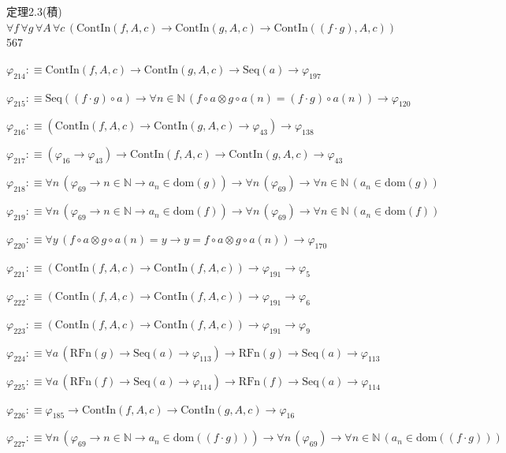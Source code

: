 \begin{fullproof}{定理2.3(積)}{$\forall f\,\forall g\,\forall A\,\forall c\,(\mathrm{ContIn}(f,A,c) \to \mathrm{ContIn}(g,A,c) \to \mathrm{ContIn}((f \cdot g),A,c))$}{567}
\begin{abbrevlist}
\item $\varphi_{214} :\equiv \mathrm{ContIn}(f,A,c) \to \mathrm{ContIn}(g,A,c) \to \mathrm{Seq}(a) \to \varphi_{197}$
\item $\varphi_{215} :\equiv \mathrm{Seq}((f \cdot g) \circ a) \to \forall n \in \mathbb{N}\,(f \circ a \otimes g \circ a(n) = (f \cdot g) \circ a(n)) \to \varphi_{120}$
\item $\varphi_{216} :\equiv (\mathrm{ContIn}(f,A,c) \to \mathrm{ContIn}(g,A,c) \to \varphi_{43}) \to \varphi_{138}$
\item $\varphi_{217} :\equiv (\varphi_{16} \to \varphi_{43}) \to \mathrm{ContIn}(f,A,c) \to \mathrm{ContIn}(g,A,c) \to \varphi_{43}$
\item $\varphi_{218} :\equiv \forall n\,(\varphi_{69} \to n \in \mathbb{N} \to a_{n} \in \mathrm{dom}(g)) \to \forall n\,(\varphi_{69}) \to \forall n \in \mathbb{N}\,(a_{n} \in \mathrm{dom}(g))$
\item $\varphi_{219} :\equiv \forall n\,(\varphi_{69} \to n \in \mathbb{N} \to a_{n} \in \mathrm{dom}(f)) \to \forall n\,(\varphi_{69}) \to \forall n \in \mathbb{N}\,(a_{n} \in \mathrm{dom}(f))$
\item $\varphi_{220} :\equiv \forall y\,(f \circ a \otimes g \circ a(n) = y \to y = f \circ a \otimes g \circ a(n)) \to \varphi_{170}$
\item $\varphi_{221} :\equiv (\mathrm{ContIn}(f,A,c) \to \mathrm{ContIn}(f,A,c)) \to \varphi_{191} \to \varphi_{5}$
\item $\varphi_{222} :\equiv (\mathrm{ContIn}(f,A,c) \to \mathrm{ContIn}(f,A,c)) \to \varphi_{191} \to \varphi_{6}$
\item $\varphi_{223} :\equiv (\mathrm{ContIn}(f,A,c) \to \mathrm{ContIn}(f,A,c)) \to \varphi_{191} \to \varphi_{9}$
\item $\varphi_{224} :\equiv \forall a\,(\mathrm{RFn}(g) \to \mathrm{Seq}(a) \to \varphi_{113}) \to \mathrm{RFn}(g) \to \mathrm{Seq}(a) \to \varphi_{113}$
\item $\varphi_{225} :\equiv \forall a\,(\mathrm{RFn}(f) \to \mathrm{Seq}(a) \to \varphi_{114}) \to \mathrm{RFn}(f) \to \mathrm{Seq}(a) \to \varphi_{114}$
\item $\varphi_{226} :\equiv \varphi_{185} \to \mathrm{ContIn}(f,A,c) \to \mathrm{ContIn}(g,A,c) \to \varphi_{16}$
\item $\varphi_{227} :\equiv \forall n\,(\varphi_{69} \to n \in \mathbb{N} \to a_{n} \in \mathrm{dom}((f \cdot g))) \to \forall n\,(\varphi_{69}) \to \forall n \in \mathbb{N}\,(a_{n} \in \mathrm{dom}((f \cdot g)))$

\end{abbrevlist}
\end{fullproof}
